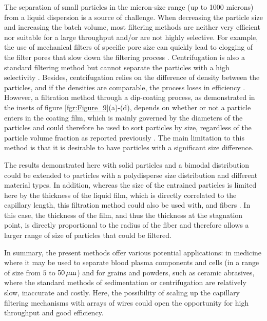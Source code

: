 \documentclass{jfm}
\begin{document}
The separation of small particles in the micron-size range (up to 1000 microns) from a liquid dispersion is a source of challenge. When decreasing the particle size and increasing the batch volume, most filtering methods are neither very efficient nor suitable for a large throughput and/or are not highly selective. For example, the use of mechanical filters of specific pore size can quickly lead to clogging of the filter pores that slow down the filtering process \citep[][]{urfer1997biological,wyss2006mechanism,dressaire2017clogging,sauret2018growth}. Centrifugation is also a standard filtering method but cannot separate the particles with a high selectivity \cite[][]{svarovsky2000solid}. Besides, centrifugation relies on the difference of density between the particles, and if the densities are comparable, the process loses in efficiency \cite[][]{ninfa2009fundamental}. However, a filtration method through a dip-coating process, as demonstrated in the insets of figure \ref{fgr:Figure_9}(a)-(d), depends on whether or not a particle enters in the coating film, which is mainly governed by the diameters of the particles and could therefore be used to sort particles by size, regardless of the particle volume fraction as reported previously \cite[][]{dincau2019capillary}. The main limitation to this method is that it is desirable to have particles with a significant size difference.

The results demonstrated here with solid particles and a bimodal distribution could be extended to particles with a polydisperse size distribution and different material types. In addition, whereas the size of the entrained particles is limited here by the thickness of the liquid film, which is directly correlated to the capillary length, this filtration method could also be used with, and fibers \cite[][]{dincau2020entrainment}. In this case, the thickness of the film, and thus the thickness at the stagnation point, is directly proportional to the radius of the fiber and therefore allows a larger range of size of particles that could be filtered. 

In summary, the present methods offer various potential applications: in medicine where it may be used to separate blood plasma components and cells (in a range of size from $5$ to $50\,\mu{\rm m}$) and for grains and powders, such as ceramic abrasives, where the standard methods of sedimentation or centrifugation are relatively slow, inaccurate and costly. Here, the possibility of scaling up the capillary filtering mechanisms with arrays of wires could open the opportunity for high throughput and good efficiency.
\end{document}
